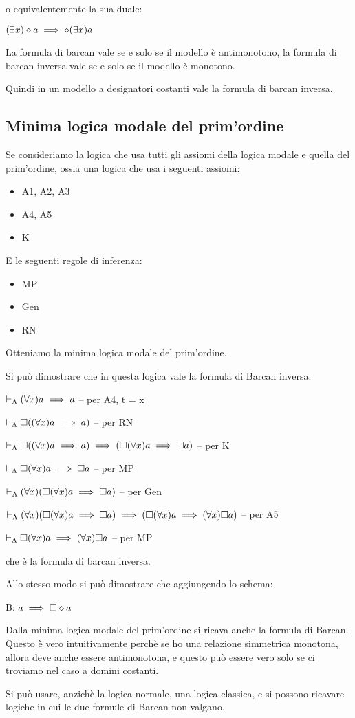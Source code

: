 o equivalentemente la sua duale:

$(\exists x)\diamond a\implies\diamond(\exists x)a$

La formula di barcan vale se e solo se il modello è antimonotono,
la formula di barcan inversa vale se e solo se il modello è monotono.

Quindi in un modello a designatori costanti vale la formula di barcan
inversa.


\subsection{Minima logica modale del prim'ordine}

Se consideriamo la logica che usa tutti gli assiomi della logica modale
e quella del prim'ordine, ossia una logica che usa i seguenti assiomi:
\begin{itemize}
\item A1, A2, A3
\item A4, A5
\item K
\end{itemize}
E le seguenti regole di inferenza:
\begin{itemize}
\item MP
\item Gen
\item RN
\end{itemize}
Otteniamo la minima logica modale del prim'ordine.

Si può dimostrare che in questa logica vale la formula di Barcan inversa:

$\vdash_{\Lambda}(\forall x)a\implies a$ -- per A4, t = x

$\vdash_{\Lambda}\square((\forall x)a\implies a)$ -- per RN

$\vdash_{\Lambda}\square((\forall x)a\implies a)\implies(\square(\forall x)a\implies\square a)$
-- per K

$\vdash_{\Lambda}\square(\forall x)a\implies\square a$ -- per MP

$\vdash_{\Lambda}(\forall x)(\square(\forall x)a\implies\square a)$ -- per Gen

$\vdash_{\Lambda}(\forall x)(\square(\forall x)a\implies\square a)\implies(\square(\forall x)a\implies(\forall x)\square a)$
-- per A5 

$\vdash_{\Lambda}\square(\forall x)a\implies(\forall x)\square a$ -- per MP

che è la formula di barcan inversa.

Allo stesso modo si può dimostrare che aggiungendo lo schema:

B: $a\implies\square\diamond a$

Dalla minima logica modale del prim'ordine si ricava anche la formula
di Barcan. Questo è vero intuitivamente perchè se ho una relazione
simmetrica monotona, allora deve anche essere antimonotona, e questo
può essere vero solo se ci troviamo nel caso a domini costanti.

Si può usare, anzichè la logica normale, una logica classica, e si
possono ricavare logiche in cui le due formule di Barcan non valgano.

